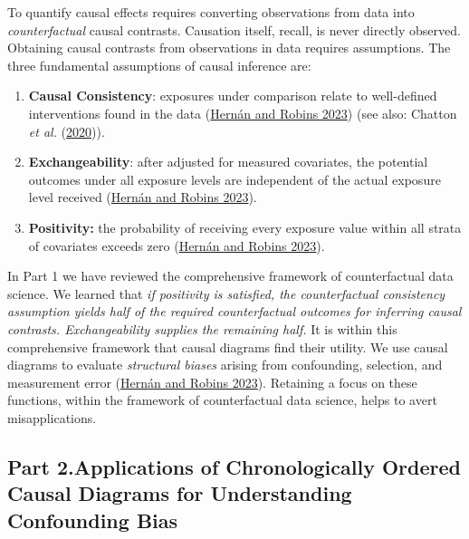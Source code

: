 \documentclass[
  singlecolumn]{article}
\begin{document}
To quantify causal effects requires converting observations from data
into \emph{counterfactual} causal contrasts. Causation itself, recall,
is never directly observed. Obtaining causal contrasts from observations
in data requires assumptions. The three fundamental assumptions of
causal inference are:

\begin{enumerate}
\def\labelenumi{\arabic{enumi}.}
\item
  \textbf{Causal Consistency}: exposures under comparison relate to
  well-defined interventions found in the data
  (\protect\hyperlink{ref-hernuxe1n2023}{Hernán and Robins 2023}) (see
  also: Chatton \emph{et al.}
  (\protect\hyperlink{ref-chatton2020}{2020})).
\item
  \textbf{Exchangeability}: after adjusted for measured covariates, the
  potential outcomes under all exposure levels are independent of the
  actual exposure level received
  (\protect\hyperlink{ref-hernuxe1n2023}{Hernán and Robins 2023}).
\item
  \textbf{Positivity:} the probability of receiving every exposure value
  within all strata of covariates exceeds zero
  (\protect\hyperlink{ref-hernuxe1n2023}{Hernán and Robins 2023}).
\end{enumerate}

In Part 1 we have reviewed the comprehensive framework of counterfactual
data science. We learned that \emph{if positivity is satisfied, the
counterfactual consistency assumption yields half of the required
counterfactual outcomes for inferring causal contrasts. Exchangeability
supplies the remaining half.} It is within this comprehensive framework
that causal diagrams find their utility. We use causal diagrams to
evaluate \emph{structural biases} arising from confounding, selection,
and measurement error (\protect\hyperlink{ref-hernuxe1n2023}{Hernán and
Robins 2023}). Retaining a focus on these functions, within the
framework of counterfactual data science, helps to avert
misapplications.

\hypertarget{part-2.applications-of-chronologically-ordered-causal-diagrams-for-understanding-confounding-bias}{%
\subsection{Part 2.Applications of Chronologically Ordered Causal
Diagrams for Understanding Confounding
Bias}\label{part-2.applications-of-chronologically-ordered-causal-diagrams-for-understanding-confounding-bias}}
\end{document}
